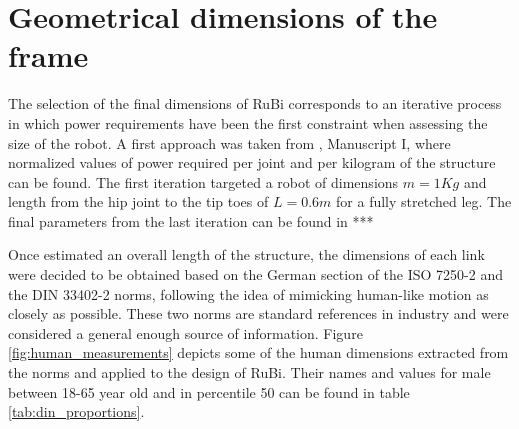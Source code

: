 
\section{Geometrical dimensions of the frame} %
\label{sec:dimensions}

The selection of the final dimensions of RuBi corresponds to an iterative process in which power requirements have been the first constraint when assessing the size of the robot.
A first approach was taken from \cite{grimmer}, Manuscript I, where normalized values of power required per joint and per kilogram of the structure can be found.
The first iteration targeted a robot of dimensions $m = 1Kg$ and length from the hip joint to the tip toes of $L = 0.6 m$ for a fully stretched leg.
The final parameters from the last iteration can be found in ***%

Once estimated an overall length of the structure, the dimensions of each link were decided to be obtained based on the German section of the ISO 7250-2 \cite{iso_measurements} and the DIN 33402-2 \cite{din_measurements1} norms, following the idea of mimicking human-like motion as closely as possible.
These two norms are standard references in industry and were considered a general enough source of information.
Figure \ref{fig:human_measurements} depicts some of the human dimensions extracted from the norms and applied to the design of RuBi.
Their names and values for male between 18-65 year old and in percentile 50 can be found in table \ref{tab:din_proportions}.

